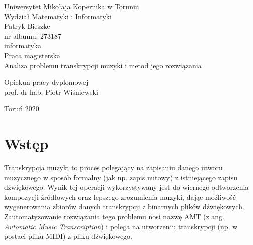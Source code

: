 \documentclass[12pt,a4paper,twoside]{mwart}
\begin{document}
\begin{titlepage}
	\begin{center}
		\large Uniwersytet Mikołaja Kopernika w Toruniu\\
		\large Wydział Matematyki i Informatyki\\
		\vspace{3cm} 
		\large Patryk Bieszke\\
			nr albumu: 273187\\
			informatyka\\
		\vspace{2cm}
		Praca magisterska\\
	
		\vspace{2cm} 
		\huge Analiza problemu transkrypcji muzyki i metod jego rozwiązania\\
	\end{center}
	\hfill
	\begin{minipage}{6cm}
		\vspace{2cm}
		Opiekun pracy dyplomowej\\
		prof. dr hab. Piotr Wiśniewski
	\end{minipage}
	\vspace{3cm}
	\begin{center}
		Toruń 2020\\
	\end{center}
\end{titlepage}



\clearpage
\thispagestyle{empty}
\mbox{}

\tableofcontents

\clearpage

\setcounter{secnumdepth}{0}
\section{Wstęp}\label{sec:wstep}
Transkrypcja muzyki to proces polegający na zapisaniu danego utworu muzycznego w sposób formalny (jak np. zapis nutowy) z istniejącego zapisu dźwiękowego. Wynik tej operacji wykorzystywany jest do wiernego odtworzenia kompozycji źródłowych oraz lepszego zrozumienia muzyki, dając możliwość wygenerowania zbiorów danych transkrypcji z binarnych plików dźwiękowych. Zautomatyzowanie rozwiązania tego problemu nosi nazwę AMT (z ang. \textit{Automatic Music Transcription}) i polega na utworzeniu transkrypcji (np. w postaci pliku MIDI) z pliku dźwiękowego.
\end{document}
